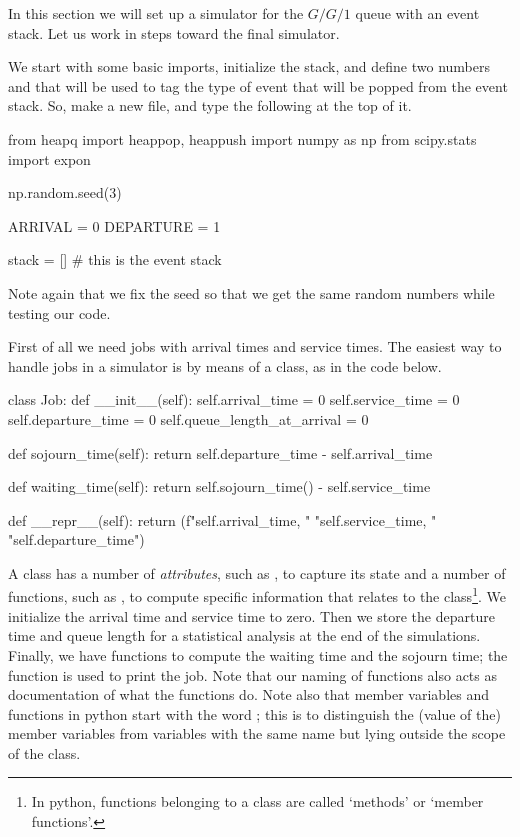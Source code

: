 In this section we will set up a simulator for the $G/G/1$ queue with  an event stack. Let us work in steps toward the final simulator.

We start with some basic imports, initialize the stack, and define two numbers  and  that will be used to tag the type of event that will be popped from the event stack.
So, make a new file, and type the following at the top of it.

\begin{pyverbatim}
from heapq import heappop, heappush
import numpy as np 
from scipy.stats import expon

np.random.seed(3) 

ARRIVAL = 0
DEPARTURE = 1

stack = [] # this is the event stack
\end{pyverbatim}

Note again that we fix the seed so that we get the same random numbers while testing our code. 


First of all we need jobs with arrival times and service times. The easiest way to handle jobs in a simulator is by means of a class, as in the code below.


\begin{pyverbatim}
class Job:
    def __init__(self):
        self.arrival_time = 0
        self.service_time = 0
        self.departure_time = 0
        self.queue_length_at_arrival = 0

    def sojourn_time(self):
        return self.departure_time - self.arrival_time

    def waiting_time(self):
        return self.sojourn_time() - self.service_time

    def __repr__(self):
        return (f"{self.arrival_time}, "
                "{self.service_time}, "
                "{self.departure_time}\n")

  
\end{pyverbatim}

A class has a number of \emph{attributes}, such as , to capture its state and a number of functions, such as , to compute specific information that relates to the class\footnote{In python, functions belonging to a class are called `methods' or `member functions'.}.
We initialize the arrival time and service time to zero.
Then we store the departure time and queue length for a statistical analysis at the end of the simulations.
Finally, we have functions to compute the waiting time and the sojourn time; the  function is used to print the job.
Note that our naming of functions also acts as documentation of what the functions do.
Note also that member variables and functions in python start with the word ; this is to distinguish the (value of the) member variables from variables with the same name but lying outside the scope of the class.

